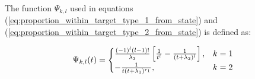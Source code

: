 The function \(\Psi_{k,l}\) used in equations 
(\ref{eq:proportion_within_target_type_1_from_state}) and 
(\ref{eq:proportion_within_target_type_2_from_state}) is defined as:

\begin{equation}
    \Psi_{k,l}(t) = 
    \begin{cases} 
        \frac{(-1)^{l} (l-1)!}{\lambda_2} \left[\frac{1}{t^l} - \frac{1}
        {(t + \lambda_2)^l}\right] , & k=1 \\
        - \frac{1}{t (t + \lambda_1)^{r_1}}, & k=2
    \end{cases} \nonumber \\
\end{equation}

